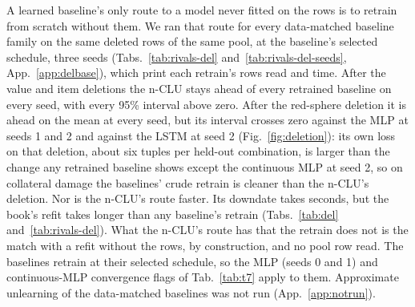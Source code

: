 \documentclass{article} %
\begin{document}
A learned baseline's only route to a model never fitted on the rows is to retrain from scratch without them. We ran
that route for every data-matched baseline family on the same deleted rows of the same %
pool, at the baseline's selected schedule, three seeds (Tabs.~\ref{tab:rivals-del}
and~\ref{tab:rivals-del-seeds}, App.~\ref{app:delbase}), which print each retrain's rows read %
and time. After the value and item deletions the n-CLU stays ahead of every %
retrained baseline on every seed, with every 95\% interval above %
zero. After the red-sphere deletion it is ahead on the mean at every seed, but its interval crosses
zero against the MLP at seeds 1 and 2 and against the LSTM at seed 2 (Fig.~\ref{fig:deletion}): %
its own loss on that deletion, about six tuples per held-out combination, is larger than the %
change any retrained baseline shows except the continuous MLP at seed 2, so on %
collateral damage the baselines' crude retrain is cleaner than the n-CLU's deletion. Nor is the
n-CLU's route faster. Its downdate takes seconds, but the book's refit takes longer %
than any baseline's retrain (Tabs.~\ref{tab:del} and~\ref{tab:rivals-del}). What the n-CLU's route has that the retrain does not %
is the match with a refit without the rows, by construction, and no pool row read. The baselines
retrain at their selected schedule, so the MLP (seeds 0 and 1) and continuous-MLP convergence flags
of Tab.~\ref{tab:t7} apply to them. Approximate unlearning of the data-matched baselines was not
run (App.~\ref{app:notrun}).
\end{document}
